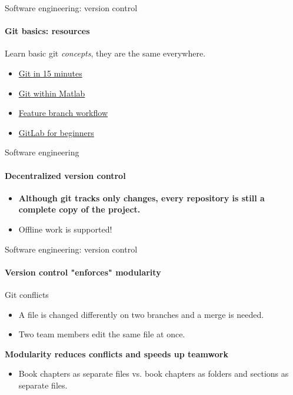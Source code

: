 \documentclass[
	aspectratio=169,%
	color={accentcolor=2d},
	logo=true,%
	colorframetitle=true,%
	]{tudabeamer}
\begin{document}
\begin{frame}{Software engineering: version control}
    \framesubtitle{Git basics: resources}
    \vfill

    Learn basic git \emph{concepts}, they are the same everywhere.  
    \begin{itemize}
        \item \href{https://www.youtube.com/watch?v=USjZcfj8yxE}{Git in 15 minutes} 
        \item \href{https://de.mathworks.com/help/matlab/source-control.html}{Git within Matlab}
        \item \href{https://www.atlassian.com/git/tutorials/comparing-workflows/feature-branch-workflow}{Feature branch workflow}
        \item \href{https://www.youtube.com/watch?v=Jt4Z1vwtXT0}{GitLab for beginners}
    \end{itemize}

\end{frame}

\begin{frame}{Software engineering}
    \framesubtitle{Decentralized version control}

    \vfill
    \centering
    \resizebox{.35\textwidth}{!}{\unskip}

    \begin{itemize}
        \item \textbf{Although git tracks only changes, every repository is still a complete copy of the project.}
        \item Offline work is supported!  
    \end{itemize}

\end{frame}

\begin{frame}{Software engineering: version control}
    \framesubtitle{Version control "enforces" modularity}

    \vfill

    Git conflicts 
    \begin{itemize}
        \item A file is changed differently on two branches and a merge is needed.
        \item Two team members edit the same file at once. 
    \end{itemize}

    \textbf{Modularity reduces conflicts and speeds up teamwork}
    \begin{itemize}
        \item Book chapters as separate files vs. book chapters as folders and sections as separate files.
    \end{itemize}

\end{frame}
\end{document}
